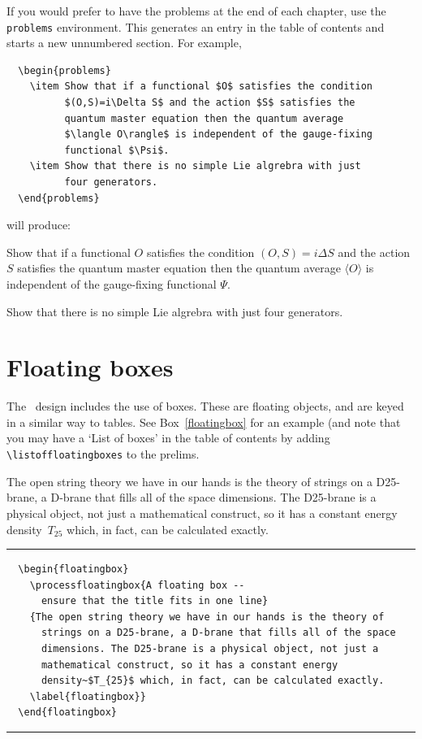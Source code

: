 If you would prefer to have the problems at the end of each chapter, use the \verb"problems" environment. This generates an entry in the table of contents and starts a new unnumbered section. For example,
\begin{verbatim}
  \begin{problems}
    \item Show that if a functional $O$ satisfies the condition
          $(O,S)=i\Delta S$ and the action $S$ satisfies the
          quantum master equation then the quantum average
          $\langle O\rangle$ is independent of the gauge-fixing
          functional $\Psi$.
    \item Show that there is no simple Lie algrebra with just
          four generators.
  \end{problems}
\end{verbatim}
will produce:
  \begin{problems}
    \item Show that if a functional $O$ satisfies the condition
          $(O,S)=i\Delta S$ and the action $S$ satisfies the
          quantum master equation then the quantum average
          $\langle O\rangle$ is independent of the gauge-fixing
          functional $\Psi$.
    \item Show that there is no simple Lie algrebra with just
          four generators.
  \end{problems}


\section{Floating boxes}

The \cambridge\ design includes the use of boxes. These are floating objects, and are keyed in a similar way to tables. See Box~\ref{floatingbox} for an example (and note that you may have a `List of boxes' in the table of contents by adding \verb"\listoffloatingboxes" to the prelims.

  \begin{floatingbox}
    {The open string theory we have in our hands is the theory of
      strings on a D25-brane, a D-brane that fills all of the space
      dimensions. The D25-brane is a physical object, not just a
      mathematical construct, so it has a constant energy
      density~$T_{25}$ which, in fact, can be calculated exactly.
    \label{floatingbox}}
  \rule[-20pt]{\textwidth}{0.5pt}
\begin{verbatim}
  \begin{floatingbox}
    \processfloatingbox{A floating box --
      ensure that the title fits in one line}
    {The open string theory we have in our hands is the theory of
      strings on a D25-brane, a D-brane that fills all of the space
      dimensions. The D25-brane is a physical object, not just a
      mathematical construct, so it has a constant energy
      density~$T_{25}$ which, in fact, can be calculated exactly.
    \label{floatingbox}}
  \end{floatingbox}
\end{verbatim}
  \rule[20pt]{\textwidth}{0.5pt}
  \end{floatingbox}

